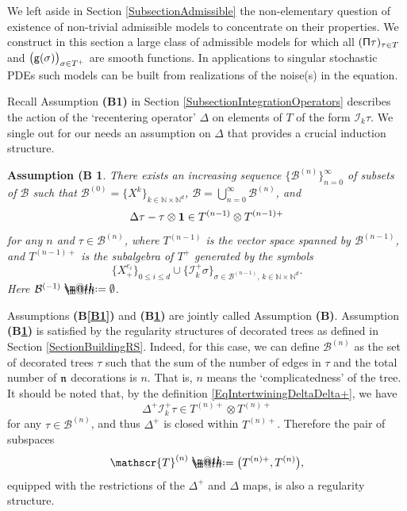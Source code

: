 \documentclass[10pt, reqno]{amsart}
\makeatletter
\numberwithin{subsection}{section}
\numberwithin{subsubsection}{subsection}
\numberwithin{equation}{section} %
\theoremstyle{mystyle}
\theoremstyle{mystyle2}
\theoremstyle{mystyle3}
\newtheorem{assumB}{Assumption (B}
\newcommand{\refB}[1]{\textbf{\textsf{(B\ref{#1})}}}
\newcommand{\REFB}{\textbf{\textsf{(B)}}}
\newcommand{\ssk}{\smallskip}
\newcommand\bbN{\mathbb{N}}
\newcommand{\mcB}{\mathcal{B}}
\newcommand{\mcI}{\mathcal{I}}
\newcommand{\Xplus}{X_+}
\newcommand*{\defeq}{\mathrel{\rlap{%
                     \raisebox{0.3ex}{$\m@th\cdot$}}%
                     \raisebox{-0.3ex}{$\m@th\cdot$}}%
                     =}
\makeatother
\begin{document}
We left aside in Section \ref{SubsectionAdmissible} the non-elementary question of existence of non-trivial admissible models to concentrate on their properties. We construct in this section a large class of admissible models for which all $({\sf \Pi}\tau)_{\tau\in T}$ and $\big({\sf g}(\sigma)\big)_{\sigma\in T^+}$ are smooth functions. In applications to singular stochastic PDEs such models can be built from realizations of the noise(s) in the equation.

\ssk

Recall Assumption \textbf{\textsf{(B1)}} in Section \ref{SubsectionIntegrationOperators} describes the action of the `recentering operator' $\Delta$ on elements of $T$ of the form $\mcI_k\tau$. We single out for our needs an assumption on $\Delta$ that provides a crucial induction structure.

\medskip

\begin{assumB}\label{B2}
There exists an increasing sequence $\{\mcB^{(n)}\}_{n=0}^\infty$ of subsets of $\mcB$ such that $\mcB^{(0)}=\{X^k\}_{k\in\bbN\times\bbN^d}$, $\mcB=\bigcup_{n=0}^\infty\mcB^{(n)}$, and
$$
\Delta\tau-\tau\otimes{\bf1}\in T^{(n-1)}\otimes T^{(n-1)+}
$$
for any $n$ and $\tau\in\mcB^{(n)}$, where $T^{(n-1)}$ is the vector space spanned by $\mcB^{(n-1)}$, and $T^{(n-1)+}$ is the subalgebra of $T^+$ generated by the symbols
$$
\{\Xplus^{e_i}\}_{0\leq i\leq d} \cup \big\{\mcI_k^+\sigma\big\}_{\sigma\in \mcB^{(n-1)},\, k\in\bbN\times\bbN^d}.
$$
Here $\mcB^{(-1)}\defeq\emptyset$.
\end{assumB}

\medskip

Assumptions \refB{B1} and \refB{B2} are jointly called Assumption \REFB. Assumption \refB{B2} is satisfied by the regularity structures of decorated trees as defined in Section \ref{SectionBuildingRS}. Indeed, for this case, we can define $\mcB^{(n)}$ as the set of decorated trees $\tau$ such that the sum of the number of edges in $\tau$ and the total number of $\frak{n}$ decorations is $n$. That is, $n$ means the `complicatedness' of the tree.
It should be noted that, by the definition \eqref{EqIntertwiningDeltaDelta+}, we have
$$
\Delta^+ \mcI_k^+\tau\in T^{(n)+}\otimes T^{(n)+}
$$
for any $\tau\in\mcB^{(n)}$, and thus $\Delta^+$ is closed within $T^{(n)+}$. Therefore the pair of subspaces
$$
\mathscr{T}^{(n)} \defeq  \big(T^{(n)+},T^{(n)}\big),
$$ 
equipped with the restrictions of the $\Delta^+$ and $\Delta$ maps, is also a regularity structure.
\end{document}
